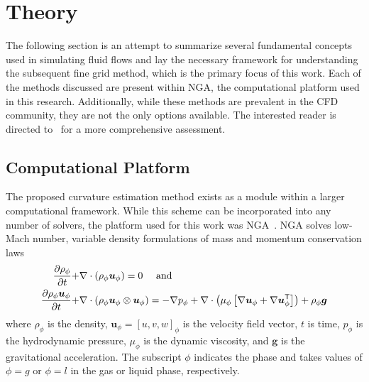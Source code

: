 \chapter{Theory} \label{CH:theory}
The following section is an attempt to summarize several fundamental concepts used in simulating fluid flows and lay the necessary framework for understanding the subsequent fine grid method, which is the primary focus of this work. Each of the methods discussed are present within NGA, the computational platform used in this research. Additionally, while these methods are prevalent in the CFD community, they are not the only options available. The interested reader is directed to~\cite{TRYG} for a more comprehensive assessment.   

\section{Computational Platform}
The proposed curvature estimation method exists as a module within a larger computational framework. While this scheme can be incorporated into any number of solvers, the platform used for this work was NGA~\cite{NGA1,NGA2}.  NGA solves low-Mach number, variable density formulations of mass and momentum conservation laws
\begin{align}
\frac{\partial \rho_\phi}{\partial t} +& \nabla \cdot \left(\rho_\phi\mbox{\boldmath{$u$}}_\phi\right) = 0\mbox{ \quad and}\\
\frac{\partial \rho_\phi \mbox{\boldmath{$u$}}_\phi}{\partial t} +& \nabla \cdot \left(\rho_\phi\mbox{\boldmath{$u$}}_\phi\otimes\mbox{\boldmath{$u$}}_\phi\right) = -\nabla p_\phi + \nabla\cdot\left(\mu_\phi\left[\nabla\mbox{\boldmath{$u$}}_\phi+\nabla\mbox{\boldmath{$u$}}_\phi^\mathsf{T}\right]\right)+\rho_\phi\mbox{\boldmath{$g$}}
\end{align}
where
$\rho_\phi$ is the density,
$\bm{u}_\phi=[u,v,w]_\phi$ is the velocity field vector,
$t$ is time,
$p_\phi$ is the hydrodynamic pressure,
$\mu_\phi$ is the dynamic viscosity, and
$\bm{g}$ is the gravitational acceleration.
The subscript
$\phi$ indicates the phase and takes values of $\phi=g$ or
$\phi=l$ in the gas or liquid phase, respectively.


